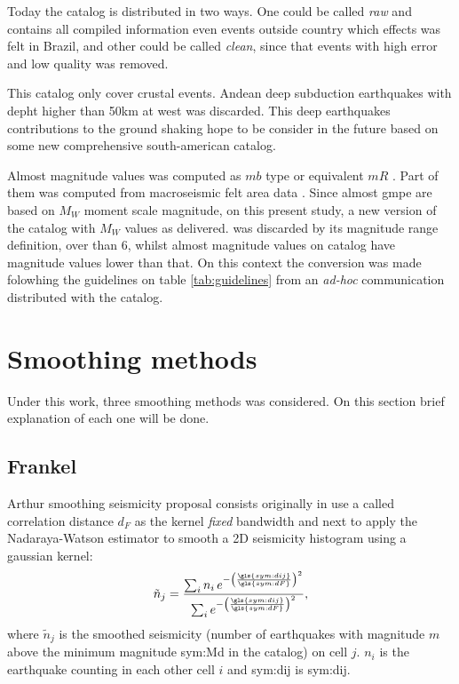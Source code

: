 \documentclass[draft, grl]{agutex}
\begin{document}
\begin{article}
Today the catalog is distributed in two ways. One could be called \emph{raw} and contains all compiled information even events outside country which effects was felt in Brazil, and other could be called \emph{clean}, since that events with high error and low quality was removed.

This catalog only cover crustal events. Andean deep subduction earthquakes with depht higher than 50km at west was discarded. This deep earthquakes contributions to the ground shaking hope to be consider in the future based on some new comprehensive south-american catalog.

Almost magnitude values was computed as $mb$ type or equivalent $mR$ \citep{assumpcao_1983}. Part of them was computed from macroseismic felt area data \citep{berrocal_1984}. Since almost \gls{gmpe} are based on $M_W$ moment scale magnitude, on this present study, a new version of the catalog with $M_W$ values as delivered. \citet{scordilis_2006} was discarded by its magnitude range definition, over than 6, whilst almost magnitude values on \citet{bsb_2014} catalog have magnitude values lower than that. On this context the conversion was made folowhing the guidelines on table \ref{tab:guidelines} from an \emph{ad-hoc} communication distributed with the catalog.




\section{Smoothing methods}
Under this work, three smoothing methods was considered. On this section brief explanation of each one will be done.

\subsection{Frankel}

Arthur \citet{frankel_1995} smoothing seismicity proposal consists originally in use a called correlation distance $d_F$ as the kernel \textit{fixed} bandwidth and next to apply the Nadaraya-Watson \citep{nadaraya_1964, watson_1964} estimator to smooth a 2D seismicity histogram using a gaussian kernel:
\begin{equation}
	\ensuremath{
		\tilde{n}_j = \frac{ \sum_{i} n_i \,e^{ - \left(\frac{\gls{sym:dij}}{\gls{sym:dF}}\right)^2}}
						   { \sum_{i}     e^{ - \left(\frac{\gls{sym:dij}}{\gls{sym:dF}}\right)^2}},
	}
	\label{eq:ni}
\end{equation}
where $\tilde{n}_j$ is the smoothed seismicity (number of earthquakes with magnitude $m$ above the minimum magnitude \gls{sym:Md} in the catalog) on cell $j$. $n_i$ is the earthquake counting in each other cell $i$ and \gls{sym:dij} is \glsdesc{sym:dij}.




\end{article}
\end{document}
